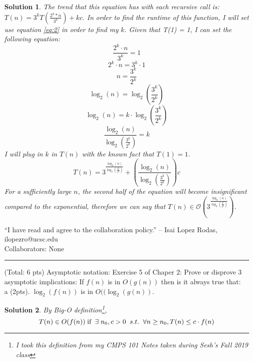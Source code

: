\documentclass[11pt]{article}
\newtheorem*{solution}{Solution}
\begin{document}
\begin{enumerate}
\begin{solution}
The trend that this equation has with each recursive call is: $T(n) = 3^kT(\frac{2^k * n}{3^k}) + kc$. In order to find the runtime of this function, I will set use equation \ref{eq:2} in order to find my $k$. Given that T(1) = 1, I can set the following equation: \begin{equation*}\frac{2^k \cdot n}{3^k} = 1 \end{equation*} \begin{equation*} 2^k \cdot n = 3^k \cdot 1\end{equation*} \begin{equation*} n = \frac{3^k}{2^k}\end{equation*} \begin{equation*} \log_2(n) = \log_2(\frac{3^k}{2^k}) \end{equation*} \begin{equation*} \log_2(n) = k \cdot \log_2(\frac{3^k}{2^k}) \end{equation*} \begin{equation*} \frac{\log_2(n)}{\log_2(\frac{3^k}{2^k})} = k  \end{equation*} I will plug in $k$ in $T(n)$ with the known fact that $T(1) = 1$. \begin{equation*} T(n) = 3^{\frac{\log_2(n)}{\log_2(\frac{3^k}{2^k})}} + (\frac{\log_2(n)}{\log_2(\frac{3^k}{2^k})})c \end{equation*} For a sufficiently large $n$, the second half of the equation will become insignificant compared to the exponential, therefore we can say that $T(n) \in \mathcal{O}(3^{\frac{\log_2(n)}{\log_2(\frac{3^k}{2^k})}})$.
\end{solution}
\newpage
“I have read and agree to the collaboration policy.” -- Isai Lopez Rodas, ilopezro@ucsc.edu
\\
Collaborators: None%
\\
\hrule
\item (Total: 6 pts) Asymptotic notation:  Exercise 5 of Chaper 2: Prove or disprove 3 asymptotic implications: If $f(n)$ is in $O(g(n))$ then is it always true that: \\
a (2pts). $\log_2 (f(n))$ is in $O(( \log_2 (g(n))$.  
\begin{solution}
	\item By Big-O definition\footnote{I took this definition from my CMPS 101 Notes taken during Sesh's Fall 2019 class}, \begin{equation}\label{eq:9} T(n) \in O(f(n)) \textnormal{\;if\;} \;\exists\;n_0,c > 0\;\;s.t.\;\; \forall n \geq n_0, T(n) \leq c \cdot f(n) \end{equation}   

\end{solution}
\end{enumerate}
\end{document}
